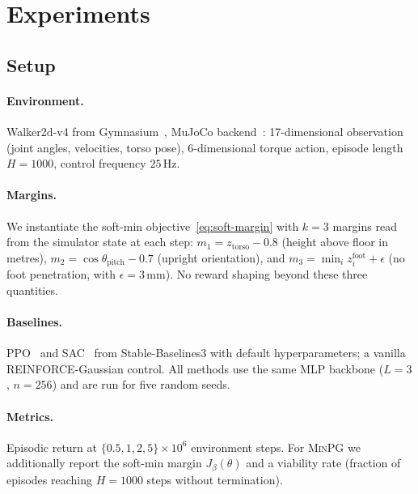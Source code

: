 \section{Experiments}
\label{sec:exp}

\subsection{Setup}
\label{sec:exp-setup}

\paragraph{Environment.}
Walker2d-v4 from Gymnasium~\cite{gymnasium2023}, MuJoCo
backend~\cite{todorov2012mujoco}: 17-dimensional observation (joint
angles, velocities, torso pose), 6-dimensional torque action,
episode length $H = 1000$, control frequency $25$\,Hz.

\paragraph{Margins.}
We instantiate the soft-min objective~\eqref{eq:soft-margin} with
$k = 3$ margins read from the simulator state at each step:
$m_1 = z_{\mathrm{torso}} - 0.8$ (height above floor in metres),
$m_2 = \cos\theta_{\mathrm{pitch}} - 0.7$ (upright orientation), and
$m_3 = \min_i z_i^{\mathrm{foot}} + \epsilon$ (no foot penetration,
with $\epsilon = 3$\,mm). No reward shaping beyond these three
quantities.

\paragraph{Baselines.}
PPO~\cite{schulman2017ppo} and SAC~\cite{haarnoja2018sac} from
Stable-Baselines3 with default hyperparameters; a vanilla
REINFORCE-Gaussian control. All methods use the same MLP backbone
($L = 3$, $n = 256$) and are run for five random seeds.

\paragraph{Metrics.}
Episodic return at $\{0.5, 1, 2, 5\} \times 10^6$ environment steps.
For \textsc{MinPG} we additionally report the soft-min margin
$J_\beta(\theta)$ and a viability rate (fraction of episodes
reaching $H = 1000$ steps without termination).

